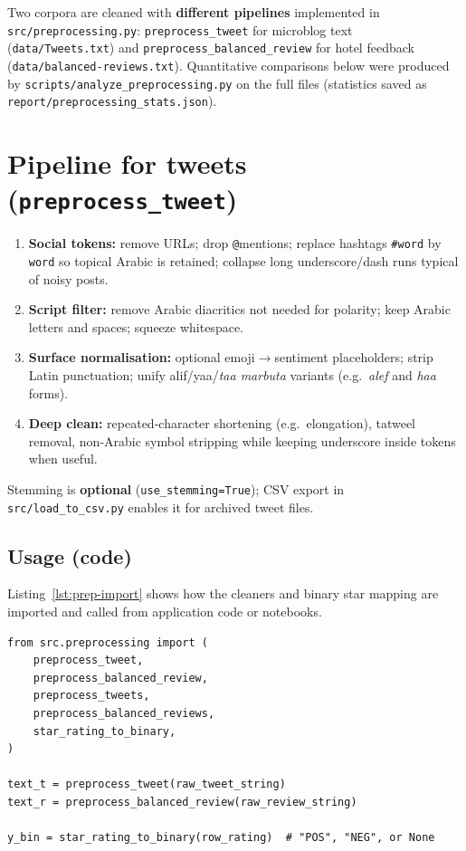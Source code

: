 \documentclass[11pt,a4paper]{report}
\begin{document}
Two corpora are cleaned with \textbf{different pipelines} implemented in \texttt{src/preprocessing.py}: \texttt{preprocess\_tweet} for microblog text (\texttt{data/Tweets.txt}) and \texttt{preprocess\_balanced\_review} for hotel feedback (\texttt{data/balanced-reviews.txt}). Quantitative comparisons below were produced by \texttt{scripts/analyze\_preprocessing.py} on the full files (statistics saved as \texttt{report/preprocessing\_stats.json}).

\section{Pipeline for tweets (\texttt{preprocess\_tweet})}

\begin{enumerate}[noitemsep]
    \item \textbf{Social tokens:} remove URLs; drop \texttt{@}mentions; replace hashtags \texttt{\#word} by \texttt{word} so topical Arabic is retained; collapse long underscore/dash runs typical of noisy posts.
    \item \textbf{Script filter:} remove Arabic diacritics not needed for polarity; keep Arabic letters and spaces; squeeze whitespace.
    \item \textbf{Surface normalisation:} optional emoji$\rightarrow$sentiment placeholders; strip Latin punctuation; unify alif/yaa/\textit{taa marbuta} variants (e.g.\ \textit{alef} and \textit{haa} forms).
    \item \textbf{Deep clean:} repeated-character shortening (e.g.\ elongation), tatweel removal, non-Arabic symbol stripping while keeping underscore inside tokens when useful.
\end{enumerate}

Stemming is \textbf{optional} (\texttt{use\_stemming=True}); CSV export in \texttt{src/load\_to\_csv.py} enables it for archived tweet files.

\subsection{Usage (code)}
Listing~\ref{lst:prep-import} shows how the cleaners and binary star mapping are imported and called from application code or notebooks.

\begin{lstlisting}[style=py, caption={Import and single-document cleaning.}, label={lst:prep-import}]
from src.preprocessing import (
    preprocess_tweet,
    preprocess_balanced_review,
    preprocess_tweets,
    preprocess_balanced_reviews,
    star_rating_to_binary,
)

text_t = preprocess_tweet(raw_tweet_string)
text_r = preprocess_balanced_review(raw_review_string)

y_bin = star_rating_to_binary(row_rating)  # "POS", "NEG", or None
\end{lstlisting}
\end{document}
